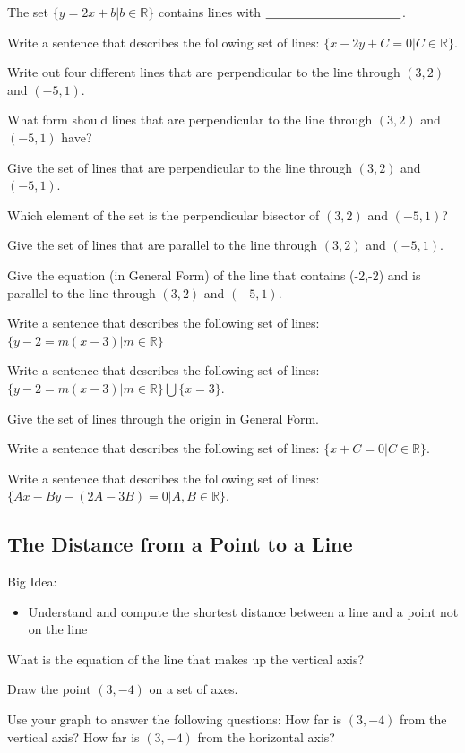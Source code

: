 The set $\{ y=2x+b| b \in \mathbb{R}\}$ contains lines with $\underline{\hspace{1.5in}}$.
\ee
\eq

\bq Write a sentence that describes the following set of lines: $\{ x-2y+C=0| C \in \mathbb{R}\}$.
\eq

\bq
\be
\item Write out four different lines that are perpendicular to the line through $(3,2)$ and $(-5,1)$.
\item What form should lines that are perpendicular to the line through $(3,2)$ and $(-5,1)$ have?
\item Give the set of lines that are perpendicular to the line through $(3,2)$ and $(-5,1)$.
\item Which element of the set is the perpendicular bisector of $(3,2)$ and $(-5,1)$?
\ee
\eq


\bq Give the set of lines that are parallel to the line through $(3,2)$ and $(-5,1)$.
\eq

\bq Give the equation (in General Form) of the line that contains (-2,-2) and is parallel to the line through $(3,2)$ and $(-5,1)$.
\eq

\bq Write a sentence that describes the following set of lines: $\{ y-2=m(x-3)| m \in \mathbb{R}\}$
\eq

\bq Write a sentence that describes the following set of lines: $\{ y-2=m(x-3)| m \in \mathbb{R}\} \bigcup \{x=3\}$.
\eq

\bq Give the set of lines through the origin in General Form.
\eq

\bq Write a sentence that describes the following set of lines: $\{ x+C=0| C \in \mathbb{R}\}$.
\eq

\bq Write a sentence that describes the following set of lines: $\{ Ax-By-(2A-3B)=0| A,B \in \mathbb{R} \}$.
\eq

\subsection{The Distance from a Point to a Line}
\begin{annotation}
\end{annotation}
Big Idea:
\begin{itemize}
\item Understand and compute the shortest distance between a line and a point not on the line
\end{itemize}
\bq
\be
\item What is the equation of the line that makes up the vertical axis?
\item Draw the point $(3,-4)$ on a set of axes.
\item Use your graph to answer the following questions:
\subitem How far is $(3,-4)$ from the vertical axis?
\subitem How far is $(3,-4)$ from the horizontal axis?
\ee
\eq

